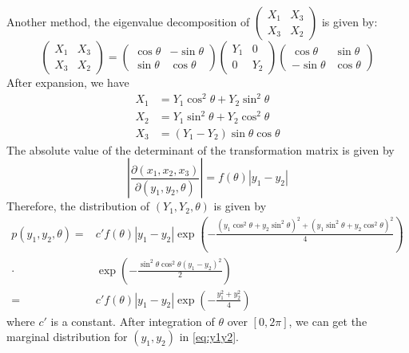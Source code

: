 \documentclass{article}
\begin{document}
\begin{enumerate}
Another method, the eigenvalue decomposition of $\begin{pmatrix}
X_1 & X_3 \\
X_3 & X_2
\end{pmatrix}
$ is given by:
$$
\begin{pmatrix}
X_1 & X_3 \\
X_3 & X_2
\end{pmatrix} =
\begin{pmatrix}
\cos \theta & -\sin\theta \\
\sin\theta & \cos\theta
\end{pmatrix}
\begin{pmatrix}
Y_1 & 0 \\
0 & Y_2
\end{pmatrix}
\begin{pmatrix}
\cos \theta & \sin\theta \\
-\sin\theta & \cos\theta
\end{pmatrix}
$$
After expansion, we have
\begin{align*}
    X_1 & = Y_1 \cos^2\theta + Y_2\sin^2\theta  \\
    X_2 & = Y_1 \sin^2\theta + Y_2\cos^2\theta  \\
    X_3 & = (Y_1 - Y_2)\sin \theta \cos \theta 
\end{align*}
The absolute value of the determinant of the transformation matrix is given by
$$
|\frac{\partial (x_1, x_2, x_3)}{\partial (y_1, y_2, \theta)}| = f(\theta)|y_1 - y_2|
$$
Therefore, the distribution of $(Y_1, Y_2, \theta)$
is given by 
\begin{align*}
p(y_1, y_2, \theta) =& c'f(\theta)|y_1-y_2|\exp(-\frac{( y_1\cos^2\theta +y_2 \sin^2\theta )^2+( y_1\sin^2\theta + y_2\cos^2\theta )^2}{4})\\
\cdot & \exp(-\frac{\sin^2\theta\cos^2\theta (y_1-y_2)^2}{2}) \\
=&c'f(\theta)|y_1-y_2|\exp(-\frac{y_1^2+y_2^2}{4})
\end{align*}
where $c'$ is a constant.
After integration of $\theta$ over $[0, 2\pi]$, we can get the marginal distribution
for $(y_1, y_2)$ in \eqref{eq:y1y2}.    
\end{enumerate}
\end{document}
